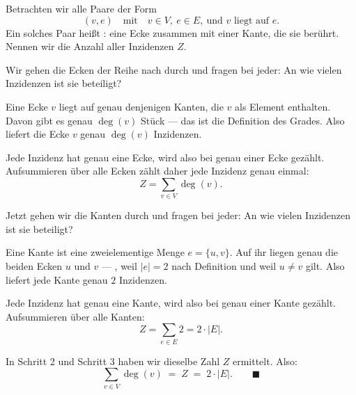 \begin{merksatz}
Betrachten wir alle Paare der Form
\[ (v, e) \quad \text{mit} \quad v \in V,\ e \in E,\ \text{und } v \text{ liegt auf } e . \]
Ein solches Paar heißt : eine Ecke zusammen mit einer Kante, die sie berührt. Nennen wir die Anzahl aller Inzidenzen $Z$.

\begin{center}
\begin{minipage}{0.88\textwidth}
\end{minipage}
\end{center}

Wir gehen die Ecken der Reihe nach durch und fragen bei jeder: An wie vielen Inzidenzen ist sie beteiligt?

Eine Ecke $v$ liegt auf genau denjenigen Kanten, die $v$ als Element enthalten. Davon gibt es genau $\deg(v)$ Stück --- das ist die Definition des Grades. Also liefert die Ecke $v$ genau $\deg(v)$ Inzidenzen.

Jede Inzidenz hat genau eine Ecke, wird also bei genau einer Ecke gezählt. Aufsummieren über alle Ecken zählt daher jede Inzidenz genau einmal:
\[ Z = \sum_{v \in V} \deg(v) . \]

Jetzt gehen wir die Kanten durch und fragen bei jeder: An wie vielen Inzidenzen ist sie beteiligt?

Eine Kante ist eine zweielementige Menge $e = \{u,v\}$. Auf ihr liegen genau die beiden Ecken $u$ und $v$ --- , weil $|e| = 2$ nach Definition und weil $u \neq v$ gilt. Also liefert jede Kante genau $2$ Inzidenzen.

Jede Inzidenz hat genau eine Kante, wird also bei genau einer Kante gezählt. Aufsummieren über alle Kanten:
\[ Z = \sum_{e \in E} 2 = 2 \cdot |E| . \]

In Schritt 2 und Schritt 3 haben wir dieselbe Zahl $Z$ ermittelt. Also:
\[ \sum_{v \in V} \deg(v) \;=\; Z \;=\; 2 \cdot |E| . \qquad \blacksquare \]
\end{merksatz}

